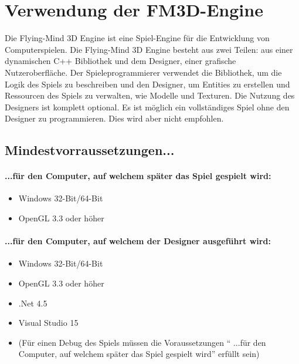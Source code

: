 \chapter[Verwendung]{Verwendung der FM3D-Engine}
Die Flying-Mind 3D Engine ist eine Spiel-Engine für die Entwicklung von Computerspielen. Die Flying-Mind 3D Engine besteht aus zwei Teilen: aus einer dynamischen C++ Bibliothek und dem Designer, einer grafische Nutzeroberfläche. Der Spieleprogrammierer verwendet die Bibliothek, um die Logik des Spiels zu beschreiben und den Designer, um Entities zu erstellen und Ressourcen des Spiels zu verwalten, wie Modelle und Texturen. Die Nutzung des Designers ist komplett optional. Es ist möglich ein vollständiges Spiel ohne den Designer zu programmieren. Dies wird aber nicht empfohlen. 

\section{Mindestvorraussetzungen...}
\subsubsection{...für den Computer, auf welchem später das Spiel gespielt wird:}
\begin{itemize}
	\item Windows 32-Bit/64-Bit
	\item OpenGL 3.3 oder höher
\end{itemize}
\subsubsection{...für den Computer, auf welchem der Designer ausgeführt wird:}
\begin{itemize}
	\item Windows 32-Bit/64-Bit
	\item OpenGL 3.3 oder höher
	\item .Net 4.5
	\item Visual Studio 15
	\item (Für einen Debug des Spiels müssen die Voraussetzungen "` ...für den Computer, auf welchem später das Spiel gespielt wird"' erfüllt sein)
\end{itemize}


